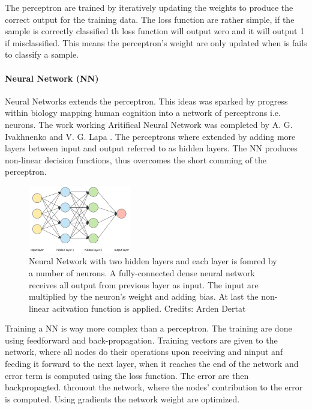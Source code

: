 The perceptron are trained by iteratively updating the weights to produce the correct output for the training data. The loss function are rather simple, if the sample is correctly classified th loss function will output zero and it will output 1 if misclassified. This means the perceptron's weight are only updated when is fails to classify a sample. 

\paragraph{Neural Network (NN)}

Neural Networks extends the perceptron. This ideas was sparked by progress within biology mapping human cognition into a network of perceptrons i.e. neurons. The work working Aritifical Neural Network was completed by A. G. Ivakhnenko and V. G. Lapa \cite{Alexey}. The perceptrons where extended by adding more layers between input and output referred to as hidden layers. The NN produces non-linear decision functions, thus overcomes the short comming of the perceptron.  

\begin{figure}[H]
    \centering
    \includegraphics[width=0.4\textwidth]{figures/nn.png}
    \caption[]{Neural Network with two hidden layers and each layer is fomred by a number of neurons. A fully-connected dense neural network receives all output from previous layer as input. The input are multiplied by the neuron's weight and adding bias. At last the non-linear acitvation function is applied. Credits: Arden Dertat}
    \label{fig:nn}
\end{figure}

Training a NN is way more complex than a perceptron. The training are done using feedforward and back-propagation. Training vectors are given to the network, where all nodes do their operations upon receiving and ninput anf feeding it forward to the next layer, when it reaches the end of the network and error term is computed using the loss function. The error are then backpropagted. throuout the network, where the nodes' contribution to the error is computed. Using gradients the network weight are optimized. 

